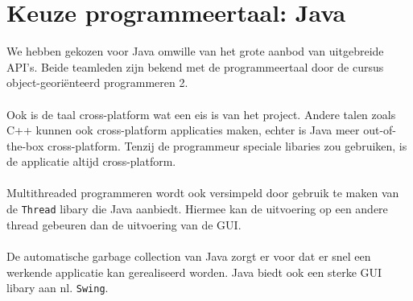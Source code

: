 \documentclass[]{article}
\begin{document}
\section{Keuze programmeertaal: Java}
We hebben gekozen voor Java omwille van het grote aanbod van uitgebreide API's. Beide teamleden zijn bekend met de programmeertaal door de cursus object-geori\"{e}nteerd programmeren 2. \\\\
Ook is de taal cross-platform wat een eis is van het project. Andere talen zoals C++ kunnen ook cross-platform applicaties maken, echter is Java meer out-of-the-box cross-platform. Tenzij de programmeur speciale libaries zou gebruiken, is de applicatie altijd cross-platform.\\\\ Multithreaded programmeren wordt ook versimpeld door gebruik te maken van de \texttt{Thread} libary die Java aanbiedt. Hiermee kan de uitvoering op een andere thread gebeuren dan de uitvoering van de GUI. \\\\De automatische garbage collection van Java zorgt er voor dat er snel een werkende applicatie kan gerealiseerd worden.  Java biedt ook een sterke GUI libary aan nl.  \texttt{Swing}. 
\end{document}
